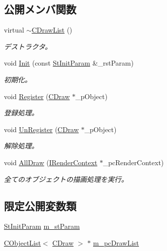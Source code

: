 \subsection*{公開メンバ関数}
\begin{DoxyCompactItemize}
\item 
virtual \hyperlink{class_c_draw_list_a6331b9e423dac5cc0d2405d5088535c0}{$\sim$\+C\+Draw\+List} ()
\begin{DoxyCompactList}\small\item\em デストラクタ。 \end{DoxyCompactList}\item 
void \hyperlink{class_c_draw_list_a56e19a77d7ed33e6009df5aea2f1848c}{Init} (const \hyperlink{struct_c_draw_list_1_1_st_init_param}{St\+Init\+Param} \&\+\_\+rst\+Param)
\begin{DoxyCompactList}\small\item\em 初期化。 \end{DoxyCompactList}\item 
void \hyperlink{class_c_draw_list_a6ecfdbccf9d8e817fc8f304e76f3b4a4}{Register} (\hyperlink{class_c_draw}{C\+Draw} $\ast$\+\_\+p\+Object)
\begin{DoxyCompactList}\small\item\em 登録処理。 \end{DoxyCompactList}\item 
void \hyperlink{class_c_draw_list_a6cbdc83efffd556cac5b7d7f03910936}{Un\+Register} (\hyperlink{class_c_draw}{C\+Draw} $\ast$\+\_\+p\+Object)
\begin{DoxyCompactList}\small\item\em 解除処理。 \end{DoxyCompactList}\item 
void \hyperlink{class_c_draw_list_a9cb8d446fb669b158e662fd6f460af9a}{All\+Draw} (\hyperlink{class_i_render_context}{I\+Render\+Context} $\ast$\+\_\+pc\+Render\+Context)
\begin{DoxyCompactList}\small\item\em 全てのオブジェクトの描画処理を実行。 \end{DoxyCompactList}\end{DoxyCompactItemize}
\subsection*{限定公開変数類}
\begin{DoxyCompactItemize}
\item 
\hyperlink{struct_c_draw_list_1_1_st_init_param}{St\+Init\+Param} \hyperlink{class_c_draw_list_aa1852cdf435d6e0d1b0057bfa29115ef}{m\+\_\+st\+Param}
\item 
\hyperlink{class_c_object_list}{C\+Object\+List}$<$ \hyperlink{class_c_draw}{C\+Draw} $>$ $\ast$ \hyperlink{class_c_draw_list_a9657465a848a483be27ca0fbb41af73a}{m\+\_\+pc\+Draw\+List}
\end{DoxyCompactItemize}
